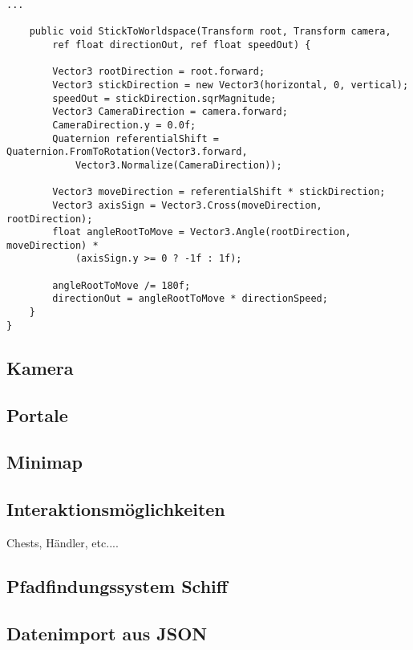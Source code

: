 \begin{scriptsize}
\begin{lstlisting}[label=lst:c_charactercontroller]
    ...

    public void StickToWorldspace(Transform root, Transform camera, 
    	ref float directionOut, ref float speedOut) {
    	
        Vector3 rootDirection = root.forward;
        Vector3 stickDirection = new Vector3(horizontal, 0, vertical);
        speedOut = stickDirection.sqrMagnitude;
        Vector3 CameraDirection = camera.forward;
        CameraDirection.y = 0.0f;
        Quaternion referentialShift = Quaternion.FromToRotation(Vector3.forward, 
        	Vector3.Normalize(CameraDirection));
        	
        Vector3 moveDirection = referentialShift * stickDirection;
        Vector3 axisSign = Vector3.Cross(moveDirection, rootDirection);
        float angleRootToMove = Vector3.Angle(rootDirection, moveDirection) * 
        	(axisSign.y >= 0 ? -1f : 1f);      
        	
        angleRootToMove /= 180f;
        directionOut = angleRootToMove * directionSpeed;
    }
}

\end{lstlisting}
\end{scriptsize}

\subsection{Kamera}





\subsection{Portale}

\subsection{Minimap}

\subsection{Interaktionsmöglichkeiten}
Chests, Händler, etc....

\subsection{Pfadfindungssystem Schiff}



\subsection{Datenimport aus JSON}


